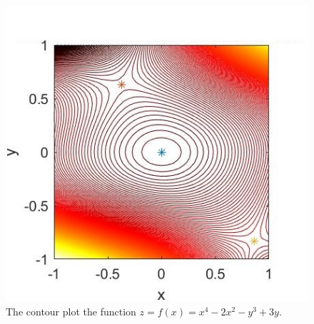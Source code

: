 \begin{figure}[H]
  \centering
  \includegraphics[width=12cm]{graphics/1b.jpg}
  \caption{The contour plot the function $ z = f(x) = x^4 - 2x^2 - y^3 + 3y $.}
\end{figure}

\vspace*{2cm}